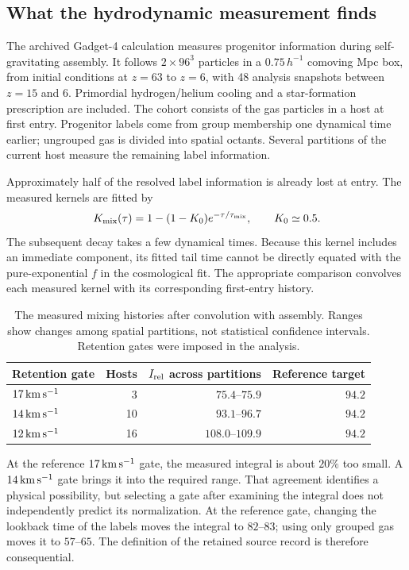 \subsection{What the hydrodynamic measurement finds}

The archived Gadget-4 calculation measures progenitor information during
self-gravitating assembly. It follows $2\times96^3$ particles in a
$0.75\,h^{-1}$ comoving Mpc box, from initial conditions at $z=63$ to
$z=6$, with 48 analysis snapshots between $z=15$ and 6. Primordial
hydrogen/helium cooling and a star-formation prescription are included.
The cohort consists of the gas particles in a host at first entry.
Progenitor labels come from group membership one dynamical time earlier;
ungrouped gas is divided into spatial octants. Several partitions of
the current host measure the remaining label information. 

Approximately half of the resolved label information is already lost at
entry. The measured kernels are fitted by
\begin{equation}
K_{\rm mix}(\tau)=1-(1-K_0)e^{-\tau/\tau_{\rm mix}},
\qquad K_0\simeq0.5.
\end{equation}
The subsequent decay takes a few dynamical times. Because this kernel
includes an immediate component, its fitted tail time cannot be directly
equated with the pure-exponential $f$ in the cosmological fit. The
appropriate comparison convolves each measured kernel with its
corresponding first-entry history.

\begin{table}[htbp]
\centering\small
\begin{tabular}{lrrr}
\toprule
Retention gate & Hosts & $I_{\rm rel}$ across partitions & Reference target \\
\midrule
$17\,\mathrm{km\,s^{-1}}$ & 3 & $75.4$--$75.9$ & $94.2$ \\
$14\,\mathrm{km\,s^{-1}}$ & 10 & $93.1$--$96.7$ & $94.2$ \\
$12\,\mathrm{km\,s^{-1}}$ & 16 & $108.0$--$109.9$ & $94.2$ \\
\bottomrule
\end{tabular}
\caption{The measured mixing histories after convolution with assembly.
Ranges show changes among spatial partitions, not statistical confidence
intervals. Retention gates were imposed in the analysis.}
\end{table}

At the reference $17\,\mathrm{km\,s^{-1}}$ gate, the measured integral is about $20\%$
too small. A $14\,\mathrm{km\,s^{-1}}$ gate brings it into the required range. That
agreement identifies a physical possibility, but selecting a gate after
examining the integral does not independently predict its normalization.
At the reference gate, changing the lookback time of the labels moves
the integral to $82$--$83$; using only grouped gas moves it to $57$--$65$.
The definition of the retained source record is therefore consequential.

